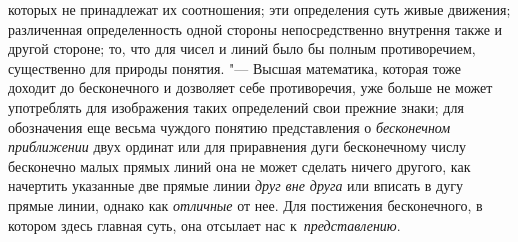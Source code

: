 которых не принадлежат их соотношения; эти определения суть живые движения;
различенная определенность одной стороны непосредственно внутрення также и
другой стороне; то, что для чисел и линий было бы полным
противоречием, существенно для природы понятия. "--- Высшая
математика, которая тоже доходит до бесконечного и дозволяет себе
противоречия, уже больше не может употреблять для изображения таких
определений свои прежние знаки; для обозначения еще весьма чуждого понятию
представления о {\em бесконечном приближении} двух ординат или для приравнения
дуги бесконечному числу бесконечно малых прямых линий она не может сделать
ничего другого, как начертить указанные две прямые линии {\em друг вне друга}
или вписать в дугу прямые линии, однако как {\em отличные} от нее. Для
постижения бесконечного, в котором здесь главная суть, она отсылает нас
к~{\em представлению}.

